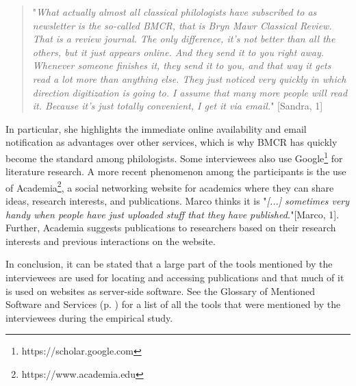 \documentclass[12pt, a4paper, titlepage, oneside, abstract=true, toc=listof, toc=bibliography, BCOR=1cm]{scrreprt}
\begin{document}
\begin{quotation}
"\textit{What actually almost all classical philologists have subscribed to as newsletter is the so-called BMCR, that is Bryn Mawr Classical Review. That is a review journal. The only difference, it's not better than all the others, but it just appears online. And they send it to you right away. Whenever someone finishes it, they send it to you, and that way it gets read a lot more than anything else. They just noticed very quickly in which direction digitization is going to. I assume that many more people will read it. Because it's just totally convenient, I get it via email.}" [Sandra, 1]
\end{quotation}

In particular, she highlights the immediate online availability and email notification as advantages over other services, which is why BMCR has quickly become the standard among philologists. %
Some interviewees also use \gls{Google}\footnote{https://scholar.google.com} for literature research. 
A more recent phenomenon among the participants is the use of \gls{Academia}\footnote{https://www.academia.edu}, a social networking website for academics where they can share ideas, research interests, and publications. Marco thinks it is "\textit{[...] sometimes very handy when people have just uploaded stuff that they have published.}"[Marco, 1]. Further, Academia suggests publications to researchers based on their research interests and previous interactions on the website.

In conclusion, it can be stated that a large part of the tools mentioned by the interviewees are used for locating and accessing publications and that much of it is used on websites as server-side software. See the Glossary of Mentioned Software and Services (p. \pageref{sec:glossary}) for a list of all the tools that were mentioned by the interviewees during the empirical study.
\end{document}
